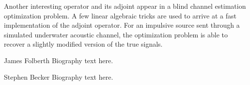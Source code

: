 \documentclass[journal]{IEEEtran}
\begin{document}
Another interesting operator and its adjoint appear in a blind channel estimation optimization problem.  A few linear algebraic tricks are used to arrive at a fast implementation of the adjoint operator.  For an impulsive source sent through a simulated underwater acoustic channel, the optimization problem is able to recover a slightly modified version of the true signals.\\





\begin{IEEEbiographynophoto}{James Folberth}
Biography text here.
\end{IEEEbiographynophoto}

\begin{IEEEbiographynophoto}{Stephen Becker}
Biography text here.
\end{IEEEbiographynophoto}
\end{document}
